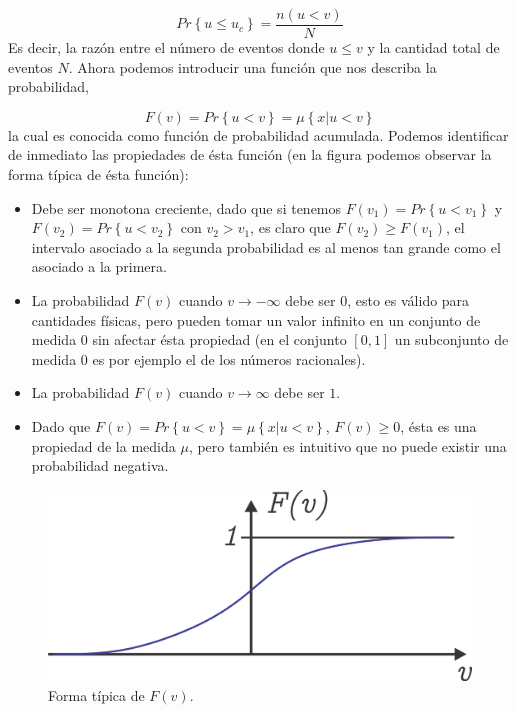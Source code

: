 \documentclass[executivepaper,12pt]{article}
\numberwithin{equation}{section}
\begin{document}
\begin{equation*}
	Pr\left\{u\leq u_c\right\}=\frac{n(u< v)}{N} 
\end{equation*}
Es decir, la razón entre el número de eventos donde $u\leq v$ y la cantidad total de eventos $N$. Ahora podemos introducir una función que nos describa la probabilidad,

\begin{equation}
	F(v)=Pr\left\{u< v\right\}=\mu\left\{x\rvert u< v\right\}
\end{equation} 
la cual es conocida como función de probabilidad acumulada. Podemos identificar de inmediato las propiedades de ésta función (en la figura podemos observar la forma típica de ésta función): 
\begin{itemize}
	\item Debe ser monotona creciente, dado que si tenemos $F(v_1)=Pr\left\{u< v_1\right\}$ y $F(v_2)=Pr\left\{u< v_2\right\}$ con $v_2>v_1$, es claro que $F(v_2)\geq F(v_1)$, el intervalo asociado a la segunda probabilidad es al menos tan grande como el asociado a la primera. 
	\item La probabilidad  $F(v)$ cuando $v\to -\infty$ debe ser $0$, esto es válido para cantidades físicas, pero pueden tomar un valor infinito en un conjunto de medida $0$ sin afectar ésta propiedad (en el conjunto $[0,1]$ un subconjunto de medida $0$ es por ejemplo el de los números racionales).
	\item La probabilidad $F(v)$ cuando $v \to \infty$ debe ser $1$. 
	\item Dado que $F(v)=	Pr\left\{u< v\right\} = \mu\left\{x\rvert u< v\right\}$, $F(v)\geq 0$, ésta es una propiedad de la medida $\mu$, pero también es intuitivo que no puede existir una probabilidad negativa. 
\end{itemize}

\begin{figure}[H]
	\begin{center}
		\includegraphics[scale=1]{probabilidad2}
	\end{center}
	\caption{Forma típica de $F(v)$.}
	\label{fig-prob2}
\end{figure}
\end{document}
